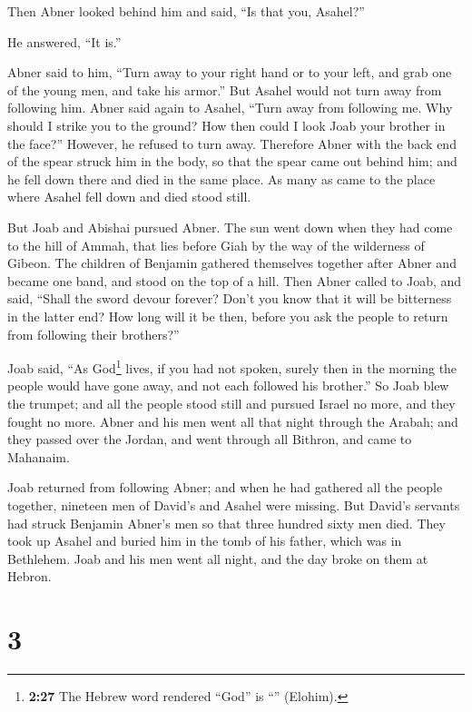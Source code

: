  Then Abner looked behind him and said, ``Is that you,
Asahel?''

He answered, ``It is.''

 Abner said to him, ``Turn away to your right hand or to
your left, and grab one of the young men, and take his armor.'' But
Asahel would not turn away from following him.  Abner
said again to Asahel, ``Turn away from following me. Why should I strike
you to the ground? How then could I look Joab your brother in the
face?''  However, he refused to turn away. Therefore
Abner with the back end of the spear struck him in the body, so that the
spear came out behind him; and he fell down there and died in the same
place. As many as came to the place where Asahel fell down and died
stood still.

 But Joab and Abishai pursued Abner. The sun went down
when they had come to the hill of Ammah, that lies before Giah by the
way of the wilderness of Gibeon.  The children of
Benjamin gathered themselves together after Abner and became one band,
and stood on the top of a hill.  Then Abner called to
Joab, and said, ``Shall the sword devour forever? Don't you know that it
will be bitterness in the latter end? How long will it be then, before
you ask the people to return from following their brothers?''

 Joab said, ``As God\footnote{\textbf{2:27} The Hebrew
  word rendered ``God'' is ``'' (Elohim).} lives, if you
had not spoken, surely then in the morning the people would have gone
away, and not each followed his brother.''  So Joab blew
the trumpet; and all the people stood still and pursued Israel no more,
and they fought no more.  Abner and his men went all that
night through the Arabah; and they passed over the Jordan, and went
through all Bithron, and came to Mahanaim.

 Joab returned from following Abner; and when he had
gathered all the people together, nineteen men of David's and Asahel
were missing.  But David's servants had struck Benjamin
Abner's men so that three hundred sixty men died.  They
took up Asahel and buried him in the tomb of his father, which was in
Bethlehem. Joab and his men went all night, and the day broke on them at
Hebron.

\hypertarget{section-2}{%
\section{3}\label{section-2}}

